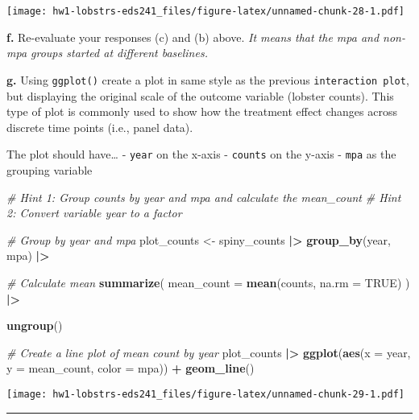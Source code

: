 \documentclass[
]{article}
\newenvironment{Shaded}{\begin{snugshade}}{\end{snugshade}}
\newcommand{\AttributeTok}[1]{\textcolor[rgb]{0.13,0.29,0.53}{#1}}
\newcommand{\CommentTok}[1]{\textcolor[rgb]{0.56,0.35,0.01}{\textit{#1}}}
\newcommand{\ConstantTok}[1]{\textcolor[rgb]{0.56,0.35,0.01}{#1}}
\newcommand{\FunctionTok}[1]{\textcolor[rgb]{0.13,0.29,0.53}{\textbf{#1}}}
\newcommand{\NormalTok}[1]{#1}
\newcommand{\OtherTok}[1]{\textcolor[rgb]{0.56,0.35,0.01}{#1}}
\newcommand{\SpecialCharTok}[1]{\textcolor[rgb]{0.81,0.36,0.00}{\textbf{#1}}}
\begin{document}
\texttt{[image: hw1-lobstrs-eds241\_files/figure-latex/unnamed-chunk-28-1.pdf]}

\textbf{f.} Re-evaluate your responses (c) and (b) above. \emph{It means
that the mpa and non-mpa groups started at different baselines.}

\textbf{g.} Using \texttt{ggplot()} create a plot in same style as the
previous \texttt{interaction\ plot}, but displaying the original scale
of the outcome variable (lobster counts). This type of plot is commonly
used to show how the treatment effect changes across discrete time
points (i.e., panel data).

The plot should have\ldots{} - \texttt{year} on the x-axis -
\texttt{counts} on the y-axis - \texttt{mpa} as the grouping variable

\begin{Shaded}
\begin{Highlighting}[]
\CommentTok{\# Hint 1: Group counts by \textasciigrave{}year\textasciigrave{} and \textasciigrave{}mpa\textasciigrave{} and calculate the \textasciigrave{}mean\_count\textasciigrave{}}
\CommentTok{\# Hint 2: Convert variable \textasciigrave{}year\textasciigrave{} to a factor}

\CommentTok{\# Group by year and mpa}
\NormalTok{plot\_counts }\OtherTok{\textless{}{-}}\NormalTok{ spiny\_counts }\SpecialCharTok{|\textgreater{}} 
    \FunctionTok{group\_by}\NormalTok{(year, mpa) }\SpecialCharTok{|\textgreater{}}
    
    \CommentTok{\# Calculate mean}
    \FunctionTok{summarize}\NormalTok{(}
        \AttributeTok{mean\_count =} \FunctionTok{mean}\NormalTok{(counts, }\AttributeTok{na.rm =} \ConstantTok{TRUE}\NormalTok{)}
\NormalTok{    ) }\SpecialCharTok{|\textgreater{}}
    
    \FunctionTok{ungroup}\NormalTok{()}

\CommentTok{\# Create a line plot of mean count by year}
\NormalTok{plot\_counts }\SpecialCharTok{|\textgreater{}} \FunctionTok{ggplot}\NormalTok{(}\FunctionTok{aes}\NormalTok{(}\AttributeTok{x =}\NormalTok{ year, }\AttributeTok{y =}\NormalTok{ mean\_count, }\AttributeTok{color =}\NormalTok{ mpa)) }\SpecialCharTok{+}
    \FunctionTok{geom\_line}\NormalTok{()}
\end{Highlighting}
\end{Shaded}

\texttt{[image: hw1-lobstrs-eds241\_files/figure-latex/unnamed-chunk-29-1.pdf]}

\begin{center}\rule{0.5\linewidth}{0.5pt}\end{center}
\end{document}

